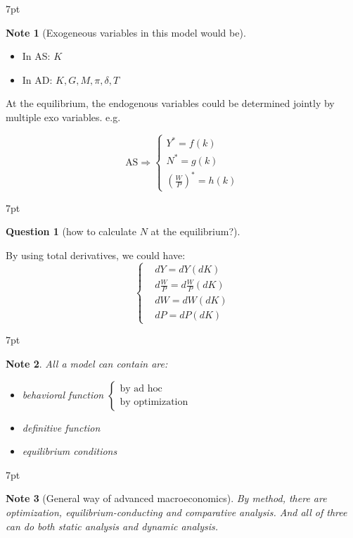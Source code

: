 \documentclass{article}
\providecommand{\tightlist}{
  \setlength{\itemsep}{0pt}
  \setlength{\parskip}{0pt}}
\newenvironment{blueblock}{
\def\FrameCommand{
  \hspace{1pt}
    {\color{DarkBlue}
    \vrule width 2pt}
    {\color{blueshade}
    \vrule width 4pt}
  \colorbox{blueshade}
}
\MakeFramed{
  \advance
  \hsize-
  \width
  \FrameRestore}
\noindent\hspace{-4.55pt}%
\begin{adjustwidth}{}{7pt}
\vspace{2pt}\vspace{2pt}
}
{\vspace{2pt}\end{adjustwidth}\endMakeFramed}
\newenvironment{redblock}{
\def\FrameCommand{
  \hspace{1pt}
    {\color{LightCoral}
    \vrule width 2pt}
    {\color{redshade}
    \vrule width 4pt}
  \colorbox{redshade}
}
\MakeFramed{
  \advance
  \hsize-
  \width
  \FrameRestore}
\noindent\hspace{-4.55pt}%
\begin{adjustwidth}{}{7pt}
\vspace{2pt}\vspace{2pt}
}
{\vspace{2pt}\end{adjustwidth}\endMakeFramed}
\newtheorem{question}{Question}
\newtheorem{note}{Note}
\begin{document}
\begin{blueblock}
\begin{note}[Exogeneous variables in this model would be]
\end{note}
\begin{itemize}
\tightlist
  \item In AS: $K$
  \item In AD: $K, G, M, \pi, \delta, T$
\end{itemize}
\end{blueblock}


At the equilibrium, the endogenous variables could be determined jointly by multiple exo variables. e.g. 

$$
\text{AS}
 \Rightarrow 
\begin{cases}
Y^{*}=f(k) \\
N^{*}=g(k) \\
(\frac{W}{P})^{*}=h(k) 
\end{cases}
$$


\begin{redblock}
\begin{question}[how to calculate $N$ at the equilibrium?]
\end{question}
By using total derivatives, we could have: 
$$\begin{cases}
&dY=dY(dK)
\\&d \frac{W}{P}=d \frac{W}{P}(dK)
\\&dW=dW(dK)
\\&dP=dP(dK)
\end{cases}$$
\end{redblock}

\begin{blueblock}
\begin{note}
All a model can contain are: 
\begin{itemize}
\tightlist
  \item behavioral function 
    $\begin{cases}
      \text{by ad hoc} \\
      \text{by optimization}
    \end{cases}$
  \item definitive function 
  \item equilibrium conditions
\end{itemize}
\end{note}
\end{blueblock}

\begin{blueblock}
\begin{note}[General way of advanced macroeconomics]
By method, there are optimization, equilibrium-conducting and comparative analysis. And all of three can do both static analysis and dynamic analysis.
\end{note}
\end{blueblock}
\end{document}
